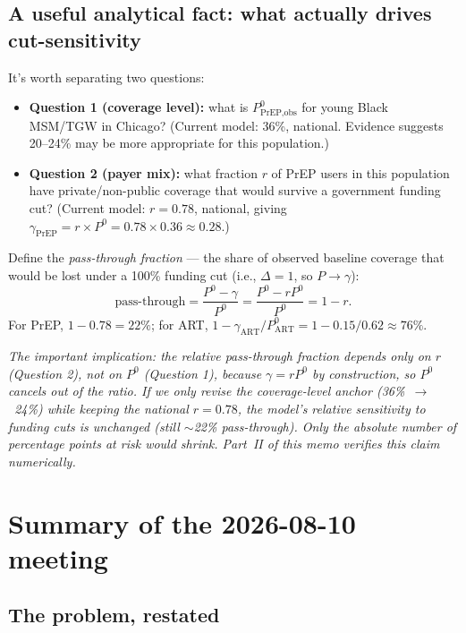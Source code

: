\documentclass[12pt]{article}
\newcommand{\note}[1]{{\color{noteblue}\textit{#1}}}
\begin{document}
\subsection{A useful analytical fact: what actually drives cut-sensitivity}

It's worth separating two questions:

\begin{itemize}
  \item \textbf{Question 1 (coverage level):} what is $P^{0}_{\text{PrEP,obs}}$
    for young Black MSM/TGW in Chicago? (Current model: 36\%, national.
    Evidence suggests 20--24\% may be more appropriate for this population.)
  \item \textbf{Question 2 (payer mix):} what fraction $r$ of PrEP users in
    this population have private/non-public coverage that would survive a
    government funding cut? (Current model: $r = 0.78$, national, giving
    $\gamma_{\text{PrEP}} = r \times P^{0} = 0.78 \times 0.36 \approx 0.28$.)
\end{itemize}

Define the \emph{pass-through fraction} --- the share of observed baseline
coverage that would be lost under a 100\% funding cut (i.e., $\Delta=1$,
so $P \to \gamma$):
\[
\text{pass-through} = \frac{P^{0} - \gamma}{P^{0}} = \frac{P^{0} - r P^{0}}{P^{0}} = 1 - r.
\]
For PrEP, $1 - 0.78 = 22\%$; for ART, $1 - \gamma_{\text{ART}}/P^{0}_{\text{ART}} =
1 - 0.15/0.62 \approx 76\%$.

\note{The important implication: the \emph{relative} pass-through fraction
depends only on $r$ (Question 2), not on $P^{0}$ (Question 1), because
$\gamma = r P^{0}$ by construction, so $P^0$ cancels out of the ratio. If we
only revise the coverage-level anchor (36\%~$\to$~24\%) while keeping the
national $r=0.78$, the model's relative sensitivity to funding cuts is
\emph{unchanged} (still $\sim$22\% pass-through). Only the absolute number
of percentage points at risk would shrink. Part~II of this memo verifies
this claim numerically.}

\section{Summary of the 2026-08-10 meeting}
\label{sec:summary}

\subsection{The problem, restated}
\end{document}
